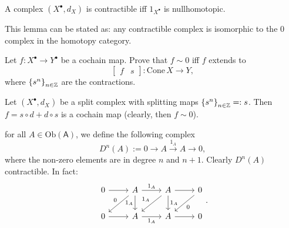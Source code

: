 \begin{lem}
	A complex $\left( X^{\bullet}, d_{X} \right)$ is contractible iff
	$1_{X^\bullet}$ is nullhomotopic.
\end{lem}
\begin{rem}[]
	This lemma can be stated as: any contractible complex is isomorphic to
	the $0$ complex in the homotopy category.
\end{rem}

\begin{lem}
	Let $f: X^\bullet \to Y^\bullet$ be a cochain map.
	Prove that $f \sim 0$ iff $f$ extends to
	\begin{equation}
		\begin{bmatrix}
			f & s
		\end{bmatrix} 
		: \mathrm{Cone}\, X \to Y
	,\end{equation} 
	where $\left\{ s^n \right\}_{n \in \mathbb{Z}}$ are the contractions.
\end{lem} 

\begin{lem}
	Let $\left( X^{\bullet}, d_{X} \right)$ be a split complex
	with splitting maps $\left\{ s^n \right\}_{n \in \mathbb{Z}} =: s$.
	Then $f = s \circ d + d \circ s$ is a cochain map (clearly, then $f \sim 0$).
\end{lem} 

\begin{rem}[]
	for all $A \in \mathrm{Ob} \left(\mathsf{A}\right)$, we define the following complex
	\begin{equation}
		D^n(A) := 0 \to A \xrightarrow{1_A} A \to 0
	,\end{equation} 
	where the non-zero elements are in degree $n$ and $n+1$.
	Clearly $D^n(A)$ contractible. In fact:
	\begin{equation}
	\begin{tikzcd}
		0 \arrow[r, "", rightarrow] &
		A \arrow[r, "1_A", rightarrow] \arrow[ld, "0"', rightarrow] \arrow[d, "1_A"', rightarrow] &
		A \arrow[r, "", rightarrow] \arrow[ld, "1_A"', rightarrow] \arrow[d, "1_A", rightarrow] &
		0 \arrow[ld, "0", rightarrow] \\
		0 \arrow[r, "", rightarrow] &
		A \arrow[r, "1_A"', rightarrow] &
		A \arrow[r, "", rightarrow] &
		0 
	\end{tikzcd}
	.\end{equation} 
\end{rem}

